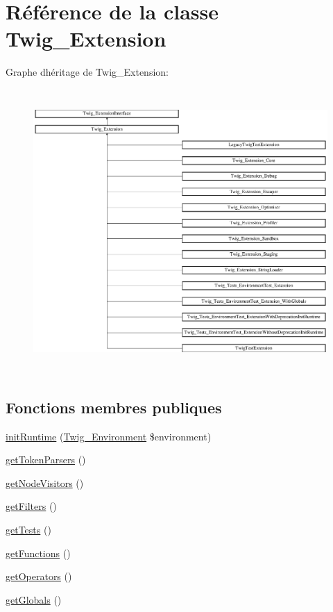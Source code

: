 \hypertarget{class_twig___extension}{}\section{Référence de la classe Twig\+\_\+\+Extension}
\label{class_twig___extension}
Graphe d\textquotesingle{}héritage de Twig\+\_\+\+Extension\+:\begin{figure}[H]
\begin{center}
\leavevmode
\includegraphics[height=10.847458cm]{class_twig___extension}
\end{center}
\end{figure}
\subsection*{Fonctions membres publiques}
\begin{DoxyCompactItemize}
\item 
\hyperlink{class_twig___extension_ab17a2e5ce3e5789febe1f3a96e61ec38}{init\+Runtime} (\hyperlink{class_twig___environment}{Twig\+\_\+\+Environment} \$environment)
\item 
\hyperlink{class_twig___extension_a8fd35903c3d01c0f0078f59d142eb063}{get\+Token\+Parsers} ()
\item 
\hyperlink{class_twig___extension_aec02093179d390d22ae4083f23a1d74a}{get\+Node\+Visitors} ()
\item 
\hyperlink{class_twig___extension_a428d91319fc73d3038784cf5436936b6}{get\+Filters} ()
\item 
\hyperlink{class_twig___extension_a7e247dd31cc8d37a6c97353a062a0080}{get\+Tests} ()
\item 
\hyperlink{class_twig___extension_a131c2522f07821f77cd1d038c216031b}{get\+Functions} ()
\item 
\hyperlink{class_twig___extension_aeaf58da661970280d00b67c17dc4f8d4}{get\+Operators} ()
\item 
\hyperlink{class_twig___extension_ae3a26252ce6efe503698085a7ed69dad}{get\+Globals} ()
\end{DoxyCompactItemize}



